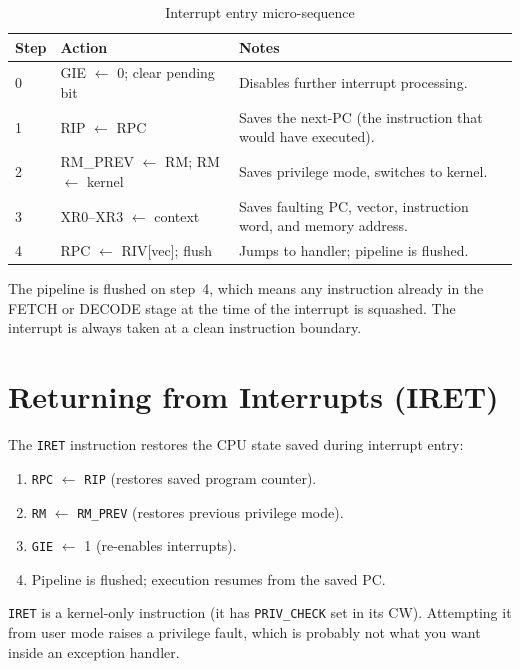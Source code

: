 \documentclass[a4paper,12pt]{report}
\newcommand{\asm}[1]{\texttt{#1}}
\newcommand{\field}[1]{\texttt{\small #1}}
\begin{document}
\begin{table}[htbp]
\centering
\caption{Interrupt entry micro-sequence}
\begin{tabularx}{\textwidth}{llX}
    \toprule
    \textbf{Step} & \textbf{Action} & \textbf{Notes} \\
    \midrule
    0 & GIE $\leftarrow$ 0; clear pending bit & Disables further interrupt processing. \\
    1 & RIP $\leftarrow$ RPC                  & Saves the next-PC (the instruction that would have executed). \\
    2 & RM\_PREV $\leftarrow$ RM; RM $\leftarrow$ kernel & Saves privilege mode, switches to kernel. \\
    3 & XR0--XR3 $\leftarrow$ context         & Saves faulting PC, vector, instruction word, and memory address. \\
    4 & RPC $\leftarrow$ RIV[vec]; flush       & Jumps to handler; pipeline is flushed. \\
    \bottomrule
\end{tabularx}
\end{table}

The pipeline is flushed on step~4, which means any instruction already in the FETCH or DECODE stage at the time of the interrupt is squashed. The interrupt is always taken at a clean instruction boundary.

\section{Returning from Interrupts (IRET)}
\label{sec:iret}

The \asm{IRET} instruction restores the CPU state saved during interrupt entry:

\begin{enumerate}
    \item \asm{RPC} $\leftarrow$ \asm{RIP} (restores saved program counter).
    \item \asm{RM} $\leftarrow$ \asm{RM\_PREV} (restores previous privilege mode).
    \item \asm{GIE} $\leftarrow$ 1 (re-enables interrupts).
    \item Pipeline is flushed; execution resumes from the saved PC.
\end{enumerate}

\asm{IRET} is a kernel-only instruction (it has \field{PRIV\_CHECK} set in its CW). Attempting it from user mode raises a privilege fault, which is probably not what you want inside an exception handler.
\end{document}
